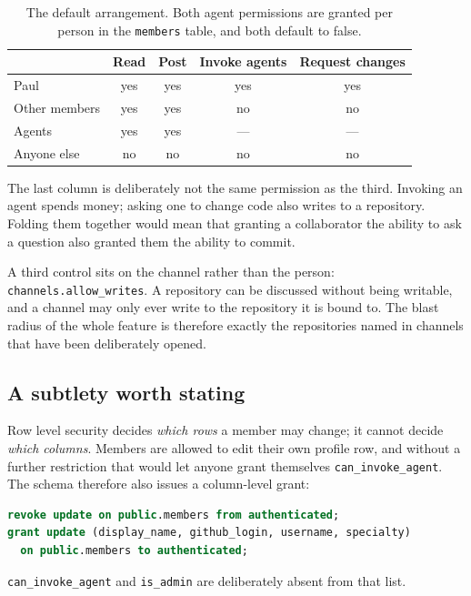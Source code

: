 \documentclass[11pt,letterpaper]{article}
\begin{document}
\begin{table}[h]
\centering
\begin{tabular}{lcccc}
\toprule
& Read & Post & Invoke agents & Request changes \\
\midrule
Paul & yes & yes & yes & yes \\
Other members & yes & yes & no & no \\
Agents & yes & yes & --- & --- \\
Anyone else & no & no & no & no \\
\bottomrule
\end{tabular}
\caption{The default arrangement. Both agent permissions are granted per person
in the \texttt{members} table, and both default to false.}
\end{table}

The last column is deliberately not the same permission as the third.
Invoking an agent spends money; asking one to change code also writes to a
repository. Folding them together would mean that granting a collaborator the
ability to ask a question also granted them the ability to commit.

A third control sits on the channel rather than the person:
\texttt{channels.allow\_writes}. A repository can be discussed without being
writable, and a channel may only ever write to the repository it is bound to.
The blast radius of the whole feature is therefore exactly the repositories
named in channels that have been deliberately opened.

\subsection{A subtlety worth stating}

Row level security decides \emph{which rows} a member may change; it cannot
decide \emph{which columns}. Members are allowed to edit their own profile row,
and without a further restriction that would let anyone grant themselves
\texttt{can\_invoke\_agent}. The schema therefore also issues a column-level
grant:

\begin{lstlisting}[language=SQL]
revoke update on public.members from authenticated;
grant update (display_name, github_login, username, specialty)
  on public.members to authenticated;
\end{lstlisting}

\texttt{can\_invoke\_agent} and \texttt{is\_admin} are deliberately absent from
that list.
\end{document}
